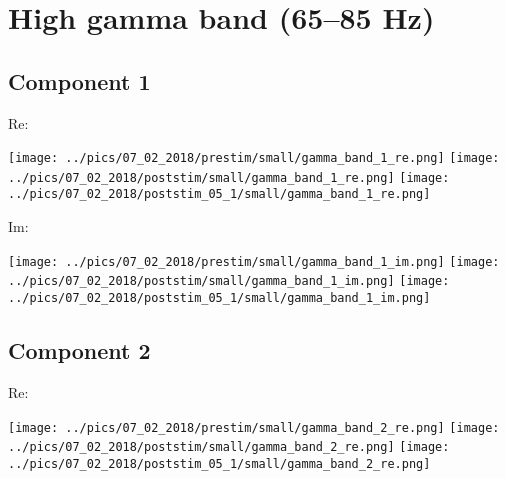 \documentclass{article}
\begin{document}

\section{High gamma band (65--85 Hz)}
\subsection*{Component 1}
Re:

\hspace{0.5cm}
\texttt{[image: ../pics/07\_02\_2018/prestim/small/gamma\_band\_1\_re.png]}
\hspace{0.5cm}
\texttt{[image: ../pics/07\_02\_2018/poststim/small/gamma\_band\_1\_re.png]}
\hspace{0.5cm}
\texttt{[image: ../pics/07\_02\_2018/poststim\_05\_1/small/gamma\_band\_1\_re.png]}

Im:

\hspace{0.5cm}
\texttt{[image: ../pics/07\_02\_2018/prestim/small/gamma\_band\_1\_im.png]}
\hspace{0.5cm}
\texttt{[image: ../pics/07\_02\_2018/poststim/small/gamma\_band\_1\_im.png]}
\hspace{0.5cm}
\texttt{[image: ../pics/07\_02\_2018/poststim\_05\_1/small/gamma\_band\_1\_im.png]}

\subsection*{Component 2}
Re:

\hspace{0.5cm}
\texttt{[image: ../pics/07\_02\_2018/prestim/small/gamma\_band\_2\_re.png]}
\hspace{0.5cm}
\texttt{[image: ../pics/07\_02\_2018/poststim/small/gamma\_band\_2\_re.png]}
\hspace{0.5cm}
\texttt{[image: ../pics/07\_02\_2018/poststim\_05\_1/small/gamma\_band\_2\_re.png]}
\end{document}
